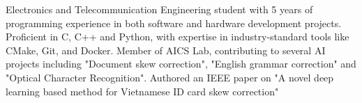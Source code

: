 
\begin{cvparagraph}
  Electronics and Telecommunication Engineering student with 5 years of programming experience in both software and hardware development projects.
  Proficient in C, C++ and Python, with expertise in industry-standard tools like CMake, Git, and Docker.
  Member of AICS Lab, contributing to several AI projects including "Document skew correction", "English grammar correction" and "Optical Character Recognition".
  Authored an IEEE paper on "A novel deep learning based method for Vietnamese ID card skew correction"


\end{cvparagraph}
